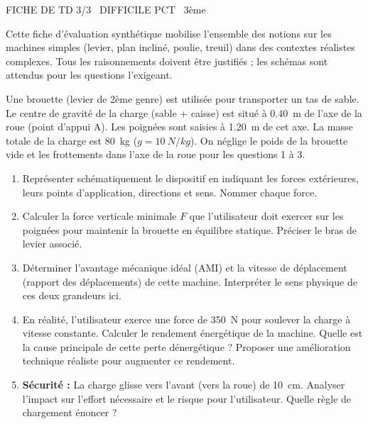 \documentclass[11pt]{article}
\begin{document}
\begin{tcolorbox}[enhanced,colback=popink,colframe=popink,arc=10pt,boxrule=0pt,left=12pt,right=12pt,top=9pt,bottom=9pt]
{\color{white}\popxbold\small FICHE DE TD 3/3 \textbullet\ DIFFICILE \hfill PCT \textbullet\ 3ème\par}
\end{tcolorbox}
\vspace{4pt}
Cette fiche d'évaluation synthétique mobilise l'ensemble des notions sur les machines simples (levier, plan incliné, poulie, treuil) dans des contextes réalistes complexes. Tous les raisonnements doivent être justifiés ; les schémas sont attendus pour les questions l'exigeant.

\begin{exercice}
Une brouette (levier de 2\`eme genre) est utilis\'ee pour transporter un tas de sable. Le centre de gravit\'e de la charge (sable + caisse) est situ\'e \`a \SI{0,40}{m} de l'axe de la roue (point d'appui A). Les poign\'ees sont saisies \`a \SI{1,20}{m} de cet axe. La masse totale de la charge est \SI{80}{kg} ($g=\SI{10}{N/kg}$). On n\'eglige le poids de la brouette vide et les frottements dans l'axe de la roue pour les questions 1 à 3.
\begin{enumerate}
    \item Repr\'esenter sch\'ematiquement le dispositif en indiquant les forces ext\'erieures, leurs points d'application, directions et sens. Nommer chaque force.
    \item Calculer la force verticale minimale $F$ que l'utilisateur doit exercer sur les poign\'ees pour maintenir la brouette en \'equilibre statique. Pr\'eciser le bras de levier associ\'e.
    \item D\'eterminer l'avantage m\'ecanique id\'eal (AMI) et la vitesse de d\'eplacement (rapport des d\'eplacements) de cette machine. Interpr\'eter le sens physique de ces deux grandeurs ici.
    \item En r\'ealit\'e, l'utilisateur exerce une force de \SI{350}{N} pour soulever la charge \`a vitesse constante. Calculer le rendement \'energ\'etique de la machine. Quelle est la cause principale de cette perte d\'energ\'etique ? Proposer une am\'elioration technique r\'ealiste pour augmenter ce rendement.
    \item \textbf{S\'ecurit\'e :} La charge glisse vers l'avant (vers la roue) de \SI{10}{cm}. Analyser l'impact sur l'effort n\'ecessaire et le risque pour l'utilisateur. Quelle r\`egle de chargement \'enoncer ?
\end{enumerate}
\end{exercice}
\end{document}
